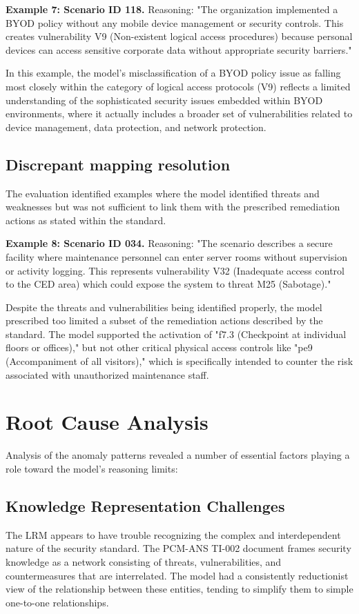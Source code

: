 \documentclass[sigconf]{acmart}
\begin{document}
\textbf{Example 7: Scenario ID 118.} Reasoning: "The organization implemented a BYOD policy without any mobile device management or security controls. This creates vulnerability V9 (Non-existent logical access procedures) because personal devices can access sensitive corporate data without appropriate security barriers."

In this example, the model's misclassification of a BYOD policy issue as falling most closely within the category of logical access protocols (V9) reflects a limited understanding of the sophisticated security issues embedded within BYOD environments, where it actually includes a broader set of vulnerabilities related to device management, data protection, and network protection.

\subsection{Discrepant mapping resolution}
The evaluation identified examples where the model identified threats and weaknesses but was not sufficient to link them with the prescribed remediation actions as stated within the standard.

\textbf{Example 8: Scenario ID 034.} Reasoning: "The scenario describes a secure facility where maintenance personnel can enter server rooms without supervision or activity logging. This represents vulnerability V32 (Inadequate access control to the CED area) which could expose the system to threat M25 (Sabotage)."

Despite the threats and vulnerabilities being identified properly, the model prescribed too limited a subset of the remediation actions described by the standard. The model supported the activation of "f7.3 (Checkpoint at individual floors or offices)," but not other critical physical access controls like "pe9 (Accompaniment of all visitors)," which is specifically intended to counter the risk associated with unauthorized maintenance staff.


\section{Root Cause Analysis}
Analysis of the anomaly patterns revealed a number of essential factors playing a role toward the model's reasoning limits:

\subsection{Knowledge Representation Challenges}
The LRM appears to have trouble recognizing the complex and interdependent nature of the security standard. The PCM-ANS TI-002 document frames security knowledge as a network consisting of threats, vulnerabilities, and countermeasures that are interrelated. The model had a consistently reductionist view of the relationship between these entities, tending to simplify them to simple one-to-one relationships. 
\end{document}
